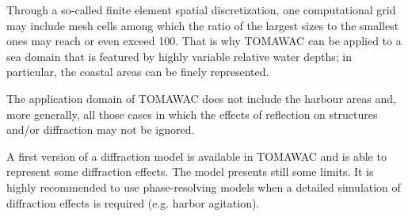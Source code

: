 Through a so-called finite element spatial discretization, one computational grid may include mesh cells among which the ratio of the largest sizes to the smallest ones may reach or even exceed 100. That is why TOMAWAC can be applied to a sea domain that is featured by highly variable relative water depths; in particular, the coastal areas can be finely represented.

The application domain of TOMAWAC does not include the harbour areas and, more generally, all those cases in which the effects of reflection on structures and/or diffraction may not be ignored.

A first version of a diffraction model is available in TOMAWAC and is able to represent some diffraction effects. The model presents still some limits. It is highly recommended to use phase-resolving models when a detailed simulation of diffraction effects is required (e.g. harbor agitation).

